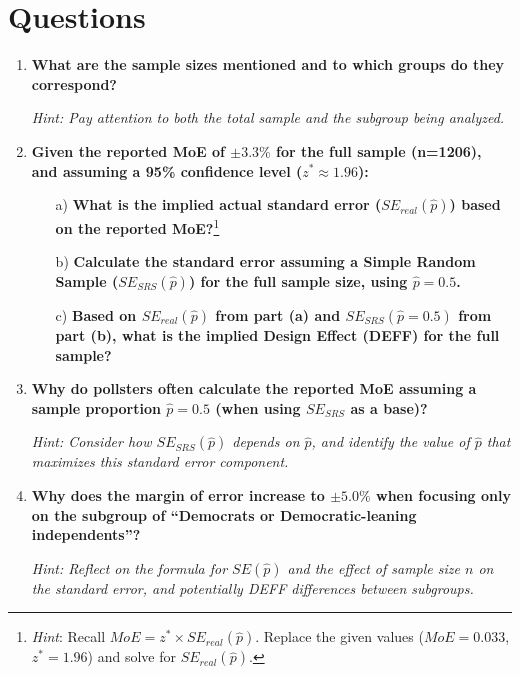 \documentclass[12pt]{article}
\begin{document}
\section*{Questions}

\begin{enumerate}
    \item \textbf{What are the sample sizes mentioned and to which groups do they correspond?}
    
    \textit{Hint: Pay attention to both the total sample and the subgroup being analyzed.}
    
    \item \textbf{Given the reported MoE of $\pm 3.3\%$ for the full sample (n=1206), and assuming a 95\% confidence level ($z^* \approx 1.96$):}
    \begin{itemize}
        \item[a)] \textbf{What is the implied actual standard error ($SE_{real}(\hat{p})$) based on the reported MoE?}\footnote{\emph{Hint}: Recall $MoE = z^* \times SE_{real}(\hat{p})$. Replace the given values ($MoE=0.033$, $z^*=1.96$) and solve for $SE_{real}(\hat{p})$.}
        \item[b)] \textbf{Calculate the standard error assuming a Simple Random Sample ($SE_{SRS}(\hat{p})$) for the full sample size, using $\hat{p}=0.5$.}
        \item[c)] \textbf{Based on $SE_{real}(\hat{p})$ from part (a) and $SE_{SRS}(\hat{p}=0.5)$ from part (b), what is the implied Design Effect (DEFF) for the full sample?}
    \end{itemize}

    \item \textbf{Why do pollsters often calculate the reported MoE assuming a sample proportion $\hat{p} = 0.5$ (when using $SE_{SRS}$ as a base)?}
    
    \textit{Hint: Consider how $SE_{SRS}(\hat{p})$ depends on $\hat{p}$, and identify the value of $\hat{p}$ that maximizes this standard error component.}

    \item \textbf{Why does the margin of error increase to $\pm 5.0\%$ when focusing only on the subgroup of ``Democrats or Democratic-leaning independents''?}
    
    \textit{Hint: Reflect on the formula for $SE(\hat{p})$ and the effect of sample size $n$ on the standard error, and potentially DEFF differences between subgroups.}


\end{enumerate}
\end{document}
